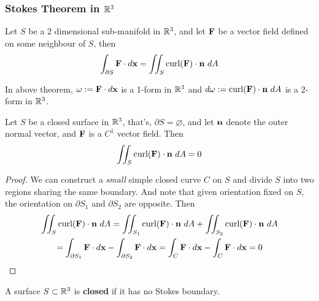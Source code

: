 \documentclass[11pt]{article}
\begin{document}
		\subsubsection{Stokes Theorem in $\mathbb{R}^3$}
			\begin{theorem}
				Let $S$ be a 2 dimensional sub-manifold in $\mathbb{R}^3$, and let $\textbf{F}$ be a vector field defined on some neighbour of $S$, then
				\begin{equation}
					\int_{\partial S} \textbf{F}\cdot d\textbf{x} = \iint_S \text{curl}(\textbf{F})\cdot \textbf{n}\ dA
				\end{equation}
			\end{theorem}
			
			\begin{remark}
				In above theorem, $\omega := \textbf{F} \cdot d \textbf{x}$ is a 1-form in $\mathbb{R}^3$ and $d \omega := \curl(\ve{F}) \cdot \ve{n}\ dA$ is a 2-form in $\mathbb{R}^3$.
			\end{remark}
			
			\begin{corollary}
				Let $S$ be a closed surface in $\mathbb{R}^3$, that's, $\partial S = \varnothing$, and let $\textbf{n}$ denote the outer normal vector, and $\textbf{F}$ is a $C^1$ vector field. Then
				\begin{equation}
					\iint_S \text{curl}(\textbf{F}) \cdot \textbf{n}\ dA = 0
				\end{equation}
				\begin{proof}
					We can construct a \emph{small} simple closed curve $C$ on $S$ and divide $S$ into two regions sharing the same boundary. And note that given orientation fixed on $S$, the orientation on $\partial S_1$ and $\partial S_2$ are opposite. Then
					\begin{gather}
						\iint_S \text{curl}(\textbf{F})\cdot \textbf{n}\ dA = \iint_{S_1} \text{curl}(\textbf{F})\cdot \textbf{n}\ dA + \iint_{S_2} \text{curl}(\textbf{F})\cdot \textbf{n}\ dA \\
						= \int_{\partial S_1} \textbf{F} \cdot d\textbf{x} - \int_{\partial S_2} \textbf{F} \cdot d\textbf{x}
						= \int_{C} \textbf{F} \cdot d\textbf{x} - \int_{C} \textbf{F} \cdot d\textbf{x} = 0
					\end{gather}
				\end{proof}
			\end{corollary}
			
			\begin{definition}
				A surface $S \subset \mathbb{R}^3$ is \textbf{closed} if it has no Stokes boundary.
			\end{definition}
			
\end{document}
